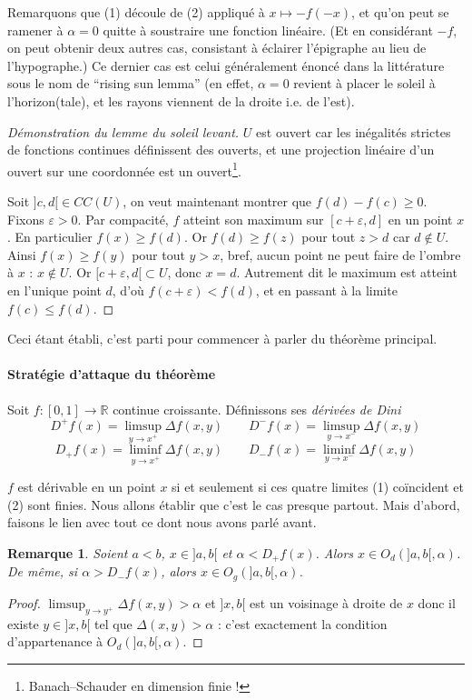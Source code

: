 \documentclass[a4paper, 11pt]{article}
\def\R{\mathbb{R}}
\newtheorem*{remark}{Remarque}
\begin{document}
Remarquons que (1) découle de (2) appliqué à $x \mapsto -f(-x)$, et qu'on peut
se ramener à $\alpha = 0$ quitte à soustraire une fonction linéaire. (Et en
considérant $-f$, on peut obtenir deux autres cas, consistant à éclairer
l'épigraphe au lieu de l'hypographe.) Ce dernier cas est celui généralement
énoncé dans la littérature sous le nom de \enquote{rising sun lemma} (en effet,
$\alpha = 0$ revient à placer le soleil à l'horizon(tale), et les rayons
viennent de la droite i.e. de l'est).

\begin{proof}[Démonstration du lemme du soleil levant]
  $U$ est ouvert car les inégalités strictes de fonctions continues définissent
  des ouverts, et une projection linéaire d'un ouvert sur une coordonnée
  est un ouvert\footnote{Banach--Schauder en dimension finie !}.

  Soit $]c,d[ \in CC(U)$, on veut maintenant montrer que $f(d) - f(c) \geq 0$.
  Fixons $\varepsilon > 0$. Par compacité, $f$ atteint son maximum sur
  $[c+\varepsilon, d]$ en un point $x$. En particulier $f(x) \geq f(d)$. Or
  $f(d) \geq f(z)$ pour tout $z > d$ car $d \not\in U$. Ainsi $f(x) \geq f(y)$
  pour tout $y > x$, bref, aucun point ne peut faire de l'ombre à $x$ : $x
  \not\in U$. Or $[c+\varepsilon,d[ \subset U$, donc $x = d$. Autrement dit le
  maximum est atteint en l'unique point $d$, d'où $f(c+\varepsilon) < f(d)$, et
  en passant à la limite $f(c) \leq f(d)$.
\end{proof}

Ceci étant établi, c'est parti pour commencer à parler du théorème principal.

\paragraph{Stratégie d'attaque du théorème}
Soit $f : [0,1] \to \R$ continue croissante.
Définissons ses \emph{dérivées de Dini}
\[ D^+f(x) = \limsup_{y \to x^+} \Delta f(x,y) \qquad
  D^-f(x) = \limsup_{y \to x^-} \Delta f(x,y) \]
\[  D_+f(x) = \liminf_{y \to x^+} \Delta f(x,y) \qquad
  D_-f(x) = \liminf_{y \to x^-} \Delta f(x,y) \]

$f$ est dérivable en un point $x$ si et seulement si ces quatre limites (1)
coïncident et (2) sont finies. Nous allons établir que c'est le cas presque
partout. Mais d'abord, faisons le lien avec tout ce dont nous avons parlé avant.

\begin{remark}
  Soient $a < b$, $x \in ]a,b[$ et $\alpha < D_+f(x)$. Alors $x \in O_d(]a,b[,
  \alpha)$. De même, si $\alpha > D_-f(x)$, alors $x \in O_g(]a,b[, \alpha)$.
\end{remark}
\begin{proof}
  $\limsup_{y \to y^+} \Delta f(x,y) > \alpha$ et $]x,b[$ est un voisinage à
  droite de $x$ donc il existe $y \in ]x,b[$ tel que $\Delta(x,y) > \alpha$ :
  c'est exactement la condition d'appartenance à $O_d(]a,b[,\alpha)$.
\end{proof}
\end{document}
